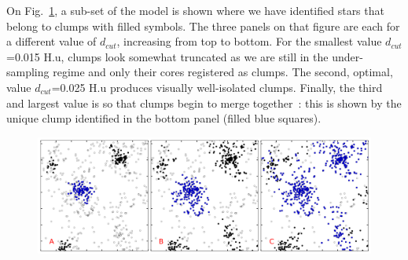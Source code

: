  
   On Fig.~\ref{Fig:1_clumpsABC}, a sub-set of the model is shown where we have identified stars that belong to clumps with filled symbols. The three panels on that figure are each for a different value of $d_{cut}$, increasing from top to bottom. For the smallest value $d_{cut}$=0.015 H.u, clumps look somewhat truncated as we are still in the under-sampling regime and only their cores registered as clumps. The second, optimal, value $d_{cut}$=0.025 H.u produces visually well-isolated clumps. Finally, the third and  largest value is so that clumps begin to merge together~: this is shown by the unique clump identified in the bottom panel (filled blue squares).
   


\begin{figure}
\begin{center}
\includegraphics[width=0.9\columnwidth]{Figures/1_clumpsABC.png}
\end{center}
\caption{}
\label{Fig:1_clumpsABC}
\end{figure} 








